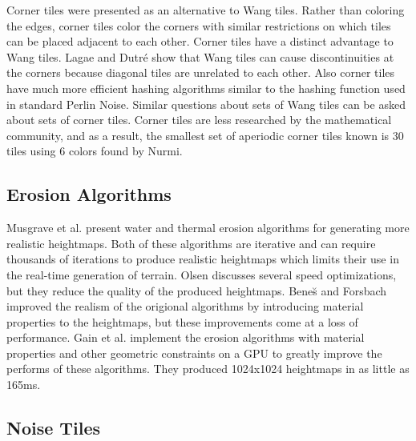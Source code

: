 \documentclass[12pt]{article}
\theoremstyle{definition}
\theoremstyle{remark}
\begin{document}
Corner tiles\cite{lagaedutre2006,lagaeetal2006} were presented as an alternative to Wang tiles. Rather than coloring the edges, corner tiles color the corners with similar restrictions on which tiles can be placed adjacent to each other. Corner tiles have a distinct advantage to Wang tiles. Lagae and Dutr{\'e}\cite{lagaedutre2006} show that Wang tiles can cause discontinuities at the corners because diagonal tiles are unrelated to each other. Also corner tiles have much more efficient hashing algorithms similar to the hashing function used in standard Perlin Noise. Similar questions about sets of Wang tiles can be asked about sets of corner tiles. Corner tiles are less researched by the mathematical community, and as a result, the smallest set of aperiodic corner tiles known is 30 tiles using 6 colors found by Nurmi\cite{nurmi2016}.

\subsection{Erosion Algorithms}

Musgrave et al.\cite{musgraveetal1989} present water and thermal erosion algorithms for generating more realistic heightmaps. Both of these algorithms are iterative and can require thousands of iterations to produce realistic heightmaps which limits their use in the real-time generation of terrain\cite{smelik2014}. Olsen\cite{olsen2004} discusses several speed optimizations, but they reduce the quality of the produced heightmaps. Bene{\u s} and Forsbach\cite{benes2001} improved the realism of the origional algorithms by introducing material properties to the heightmaps, but these improvements come at a loss of performance. Gain et al.\cite{gain2015} implement the erosion algorithms with material properties and other geometric constraints on a GPU to greatly improve the performs of these algorithms. They produced 1024x1024 heightmaps in as little as 165ms. 

\subsection{Noise Tiles}
\end{document}
